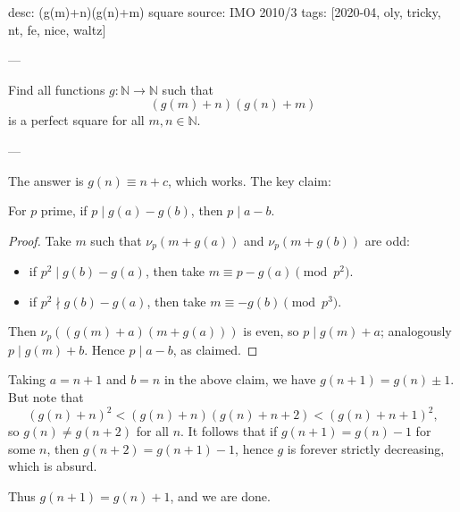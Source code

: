 desc: (g(m)+n)(g(n)+m) square
source: IMO 2010/3
tags: [2020-04, oly, tricky, nt, fe, nice, waltz]

---

Find all functions $g:\mathbb N\to\mathbb N$ such that \[(g(m)+n)(g(n)+m)\]
is a perfect square for all $m,n\in\mathbb N$.

---

The answer is $g(n)\equiv n+c$, which works. The key claim:
\begin{claim*}
    For $p$ prime, if $p\mid g(a)-g(b)$, then $p\mid a-b$.
\end{claim*}
\begin{proof}
    Take $m$ such that $\nu_p(m+g(a))$ and $\nu_p(m+g(b))$ are odd:
    \begin{itemize}[itemsep=0em]
        \item if $p^2\mid g(b)-g(a)$, then take $m\equiv p-g(a)\pmod{p^2}$.
        \item if $p^2\nmid g(b)-g(a)$, then take $m\equiv -g(b)\pmod{p^3}$.
    \end{itemize}
    Then $\nu_p( (g(m)+a)(m+g(a)))$ is even, so $p\mid g(m)+a$; analogously $p\mid g(m)+b$. Hence $p\mid a-b$, as claimed.
\end{proof}

Taking $a=n+1$ and $b=n$ in the above claim, we have $g(n+1)=g(n)\pm1$. But note that \[(g(n)+n)^2<(g(n)+n)(g(n)+n+2)<(g(n)+n+1)^2,\]
so $g(n)\ne g(n+2)$ for all $n$. It follows that if $g(n+1)=g(n)-1$ for some $n$, then $g(n+2)=g(n+1)-1$, hence $g$ is forever strictly decreasing, which is absurd.

Thus $g(n+1)=g(n)+1$, and we are done.
